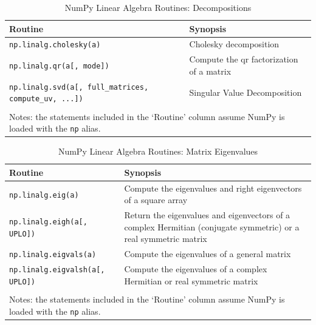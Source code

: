 \documentclass[a4paper,11pt]{book}
\begin{document}
\begin{table}
	\centering
	\caption{NumPy Linear Algebra Routines: Decompositions}
	\label{tab:decompositions}
	\begin{tabular}{ll}
		\toprule \toprule
			Routine & Synopsis \\
			\midrule
                        \texttt{np.linalg.cholesky(a)} &
                        Cholesky decomposition\\
                        \texttt{np.linalg.qr(a[, mode])} & 
                        Compute the qr factorization of a matrix\\
                        \texttt{np.linalg.svd(a[, full\_matrices, compute\_uv, ...])} & 
                        Singular Value Decomposition\\
	     	\bottomrule \\[-1.8ex]
	        \multicolumn{2}{l}{Notes: the statements included in the `Routine' column assume NumPy is loaded with the \texttt{np} alias.} \\
	\end{tabular}
\end{table}

\begin{table}
	\centering
	\caption{NumPy Linear Algebra Routines: Matrix Eigenvalues}
	\label{tab:eigenvalues}
	\begin{tabular}{lp{12cm}}
		\toprule \toprule
			Routine & Synopsis \\
			\midrule
                        \texttt{np.linalg.eig(a)} &
                        Compute the eigenvalues and right eigenvectors of a square array\\
                        \texttt{np.linalg.eigh(a[, UPLO])} & 
                        Return the eigenvalues and eigenvectors of a complex Hermitian (conjugate symmetric) or a real symmetric matrix\\
                        \texttt{np.linalg.eigvals(a)} & 
                        Compute the eigenvalues of a general matrix\\
                        \texttt{np.linalg.eigvalsh(a[, UPLO])} &
                        Compute the eigenvalues of a complex Hermitian or real symmetric matrix\\
	     	\bottomrule \\[-1.8ex]
	        \multicolumn{2}{l}{Notes: the statements included in the `Routine' column assume NumPy is loaded with the \texttt{np} alias.} \\
	\end{tabular}
\end{table}
\end{document}
